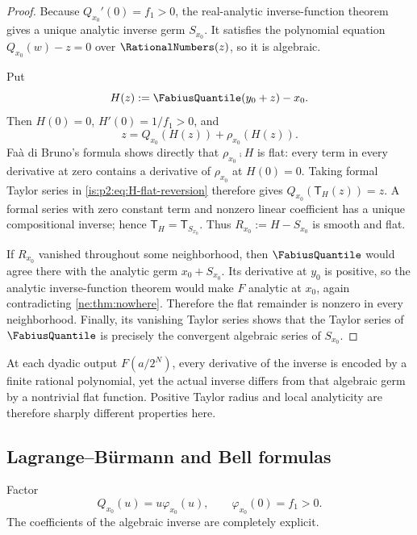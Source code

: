 \begin{proof}
Because $Q_{x_0}'(0)=f_1>0$, the real-analytic inverse-function theorem
gives a unique analytic inverse germ $S_{x_0}$.  It satisfies the polynomial
equation $Q_{x_0}(w)-z=0$ over $\RationalNumbers(z)$, so it is algebraic.

Put
\[
 H(z):=\FabiusQuantile(y_0+z)-x_0.
\]
Then $H(0)=0$, $H'(0)=1/f_1>0$, and
\begin{equation}
 z=Q_{x_0}(H(z))+\rho_{x_0}(H(z)).
 \label{is:p2:eq:H-flat-reversion}
\end{equation}
Fa\`a di Bruno's formula shows directly that $\rho_{x_0}\comp H$ is flat:
every term in every derivative at zero contains a derivative of
$\rho_{x_0}$ at $H(0)=0$.  Taking formal Taylor series in
\eqref{is:p2:eq:H-flat-reversion} therefore gives
$Q_{x_0}(\mathsf T_H(z))=z$.  A formal series with zero constant term and
nonzero linear coefficient has a unique compositional inverse; hence
$\mathsf T_H=\mathsf T_{S_{x_0}}$.  Thus
$R_{x_0}:=H-S_{x_0}$ is smooth and flat.

If $R_{x_0}$ vanished throughout some neighborhood, then
$\FabiusQuantile$ would agree there with the analytic germ
$x_0+S_{x_0}$.  Its derivative at $y_0$ is positive, so the analytic
inverse-function theorem would make $F$ analytic at $x_0$, again
contradicting \cref{ne:thm:nowhere}.  Therefore the flat remainder is
nonzero in every neighborhood.  Finally, its vanishing Taylor series shows
that the Taylor series of $\FabiusQuantile$ is precisely the convergent
algebraic series of $S_{x_0}$.
\end{proof}

\begin{resultbox}
At each dyadic output $F(a/2^N)$, every derivative of the inverse is encoded
by a finite rational polynomial, yet the actual inverse differs from that
algebraic germ by a nontrivial flat function.  Positive Taylor radius and
local analyticity are therefore sharply different properties here.
\end{resultbox}

\subsection{Lagrange--B\"urmann and Bell formulas}

Factor
\begin{equation}
 Q_{x_0}(u)=u\varphi_{x_0}(u),
 \qquad
 \varphi_{x_0}(0)=f_1>0.
 \label{is:p2:eq:Q-phi}
\end{equation}
The coefficients of the algebraic inverse are completely explicit.

